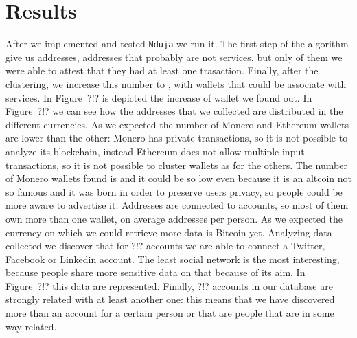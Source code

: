 \newcommand{\accountGitlab}{2}

\newcommand{\accountBitbucket}{1}





\section{Results} \label{results}
After we implemented and tested \texttt{Nduja} we run it. The first step of the
algorithm give us \startingNumberAllWallets{} addresses,
\startingNumberWalletsNotService{} addresses that probably are not services,
but only \startingNumberWalletsAtLeastOneTransaction{} of them we were able to
attest that they had at least one trasaction. Finally, after the clustering,
we increase this number to \clusteringNumberAllWallets{}, with
\clusteringNumberWalletsNotService{} wallets that could be associate with
services. In Figure~?!? is depicted the increase of wallet we found out.
In Figure~?!? we can see how the addresses that we collected are distributed
in the different currencies. As we expected the number of Monero and Ethereum
wallets are lower than the other: Monero has private transactions, so it is not
possible to analyze its blockchain, instead Ethereum does not allow
multiple-input transactions, so it is not possible to cluster wallets as for
the others. The number of Monero wallets found is \startingXMR{} and it could
be so low even because it is an altcoin not so famous and it was born in order
to preserve users privacy, so people could be more aware to advertise it.
Addresses are connected to \accountNumber{} accounts, so most of them own more
than one wallet, on average \avarageAccount{} addresses per person.
As we expected the currency on which
we could retrieve more data is Bitcoin yet. Analyzing data collected we discover
that for ?!? accounts we are able to connect a Twitter, Facebook or Linkedin
account. The least social network is the most interesting, because people share
more sensitive data on that because of its aim. In Figure~?!? this data are
represented. Finally, ?!? accounts in our database are strongly related with at
least another one: this means that we have discovered more than an account for
a certain person or that are people that are in some way related.

